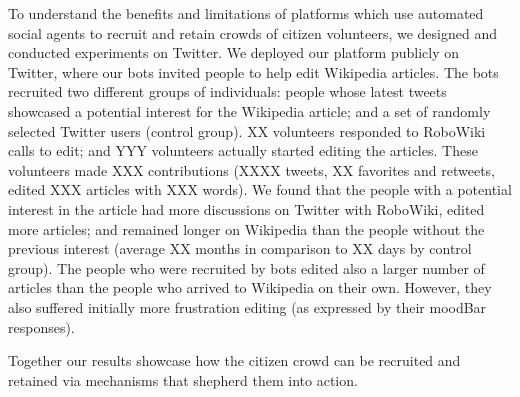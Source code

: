 \documentclass{sigchi}
\begin{document}
To understand the benefits and limitations of platforms which use automated social agents to recruit and retain crowds of citizen volunteers, we designed and conducted experiments on Twitter.  We deployed our platform publicly on Twitter, where our bots invited people to help edit Wikipedia articles. The bots recruited two different groups of individuals: people whose latest tweets showcased a potential interest for the Wikipedia article; and a set of randomly selected Twitter users (control group).  XX  volunteers responded to RoboWiki calls to edit; and YYY volunteers actually started editing the articles. These volunteers made XXX contributions (XXXX tweets,  XX favorites and retweets, edited XXX articles with XXX words). We found that the people with a potential interest in the article had more discussions on Twitter with RoboWiki, edited more articles; and remained longer on Wikipedia than the people without the previous interest (average XX months in comparison to XX days by control group). The people who were recruited by bots edited also a larger number of articles than the people who arrived to Wikipedia on their own. However, they also suffered initially more frustration editing (as expressed by their moodBar responses).

Together our results showcase how the citizen crowd can be recruited and retained via mechanisms that shepherd them into action.

\end{document}
